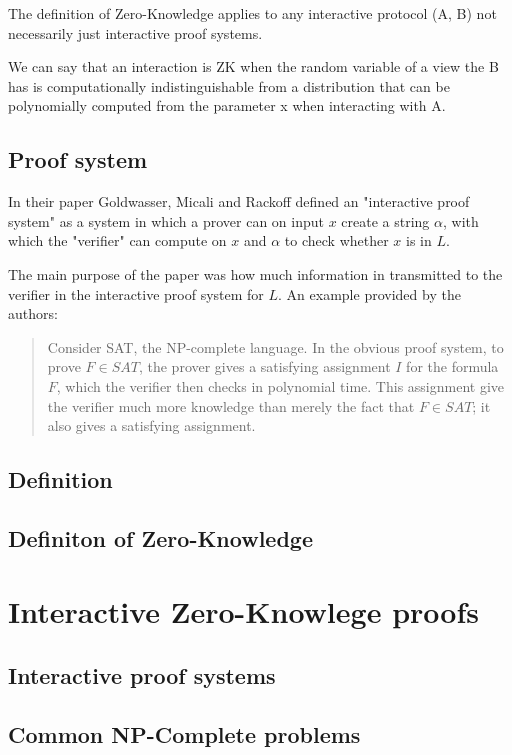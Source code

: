 \documentclass[12pt,a4paper]{article}
\begin{document}
The definition of Zero-Knowledge applies to any interactive protocol (A, B) not necessarily just interactive proof systems.




We can say that an interaction is ZK when the random variable of a view the B has is computationally indistinguishable from a distribution that can be polynomially computed from the parameter x when interacting with A.

 

\subsection{Proof system}
In their paper \cite{10.1145/22145.22178} Goldwasser, Micali and Rackoff defined an "interactive proof system" as a system in which a prover can on input $x$ create a string $\alpha$, with which the "verifier" can compute on $x$ and $\alpha$ to check whether $x$ is in $L$.

The main purpose of the paper was how much information in transmitted to the verifier in the interactive proof system for $L$.
An example provided by the authors:
\begin{quotation}
Consider SAT, the NP-complete language. In the obvious proof system, to prove $F \in SAT$, the prover gives a satisfying assignment $I$ for the formula $F$, which the verifier then checks in polynomial time. This assignment give the verifier much more knowledge than merely the fact that $F \in SAT$; it also gives a satisfying assignment.
\end{quotation}

\subsection{Definition}
\subsection{Definiton of Zero-Knowledge}
\section{Interactive Zero-Knowlege proofs}
\subsection{Interactive proof systems}
\subsection{Common NP-Complete problems}
\end{document}
